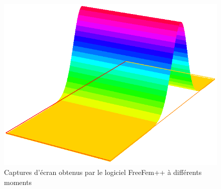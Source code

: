 \begin{figure}[!h]
\begin{center}
\includegraphics[scale=0.3]{images/capture8.png}
\end{center}
\caption{Captures d'écran obtenus par le logiciel FreeFem++ à différents moments}
\label{freeFemSV}
\end{figure}
